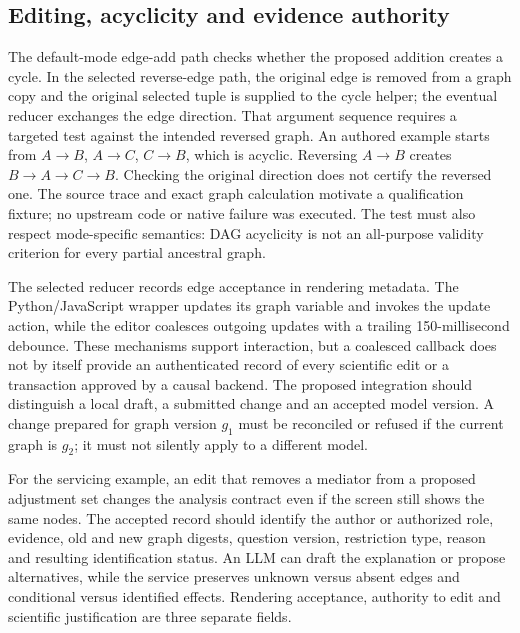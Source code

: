 \subsection{Editing, acyclicity and evidence authority}
The default-mode edge-add path checks whether the proposed addition creates
a cycle. In the selected reverse-edge path, the original edge is removed from
a graph copy and the original selected tuple is supplied to the cycle helper;
the eventual reducer exchanges the edge direction. That argument sequence
requires a targeted test against the intended reversed graph. An authored
example starts from $A\to B$, $A\to C$, $C\to B$, which is acyclic. Reversing
$A\to B$ creates $B\to A\to C\to B$. Checking the original direction does
not certify the reversed one. The source trace and exact graph calculation
motivate a qualification fixture; no upstream code or native failure was
executed. The test must also respect mode-specific semantics: DAG acyclicity
is not an all-purpose validity criterion for every partial ancestral graph.
\citep{exec25_dara_source,exec25_dara_choice}

The selected reducer records edge acceptance in rendering metadata. The
Python/JavaScript wrapper updates its graph variable and invokes the update
action, while the editor coalesces outgoing updates with a trailing
150-millisecond debounce. These mechanisms support interaction, but a
coalesced callback does not by itself provide an authenticated record of every
scientific edit or a transaction approved by a causal backend. The proposed
integration should distinguish a local draft, a submitted change and an
accepted model version. A change prepared for graph version $g_1$ must be
reconciled or refused if the current graph is $g_2$; it must not silently
apply to a different model.~\citep{exec25_dara_source,exec25_dara_choice}

For the servicing example, an edit that removes a mediator from a proposed
adjustment set changes the analysis contract even if the screen still shows
the same nodes. The accepted record should identify the author or authorized
role, evidence, old and new graph digests, question version, restriction type,
reason and resulting identification status. An LLM can draft the explanation
or propose alternatives, while the service preserves unknown versus absent
edges and conditional versus identified effects. Rendering acceptance,
authority to edit and scientific justification are three separate fields.
\citep{exec25_dara_choice}

